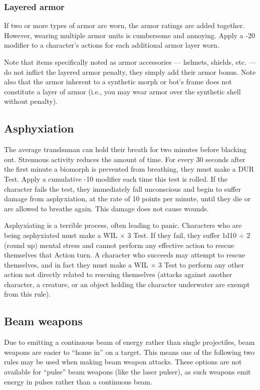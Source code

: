 \subsubsection{Layered armor}

If two or more types of armor are worn, the armor ratings are added together. However, wearing multiple armor units is cumbersome and annoying. Apply a -20 modifier to a character’s actions for each additional armor layer worn.

Note that items specifically noted as armor accessories --- helmets, shields, etc. --- do not inflict the layered armor penalty, they simply add their armor bonus. Note also that the armor inherent to a synthetic morph or bot’s frame does not constitute a layer of armor (i.e., you may wear armor over the synthetic shell without penalty).


\subsection{Asphyxiation}
\label{sec:asphyxiation}

The average transhuman can hold their breath for two minutes before blacking out. Strenuous activity reduces the amount of time. For every 30 seconds after the first minute a biomorph is prevented from breathing, they must make a DUR Test. Apply a cumulative -10 modifier each time this test is rolled. If the character fails the test, they immediately fall unconscious and begin to suffer damage from asphyxiation, at the rate of 10 points per minute, until they die or are allowed to breathe again. This damage does not cause wounds.

Asphyxiating is a terrible process, often leading to panic. Characters who are being asphyxiated must make a WIL $\times$ 3 Test. If they fail, they suffer 1d10 $\div$ 2 (round up) mental stress and cannot perform any effective action to rescue themselves that Action turn. A character who succeeds may attempt to rescue themselves, and in fact they must make a WIL $\times$ 3 Test to perform any other action not directly related to rescuing themselves (attacks against another character, a creature, or an object holding the character underwater are exempt from this rule).


\subsection{Beam weapons}
\label{sec:combat-beam-weapons}

Due to emitting a continuous beam of energy rather than single projectiles, beam weapons are easier to ``home in'' on a target. This means one of the following two rules may be used when making beam weapon attacks. These options are not available for ``pulse'' beam weapons (like the laser pulser), as such weapons emit energy in pulses rather than a continuous beam.

